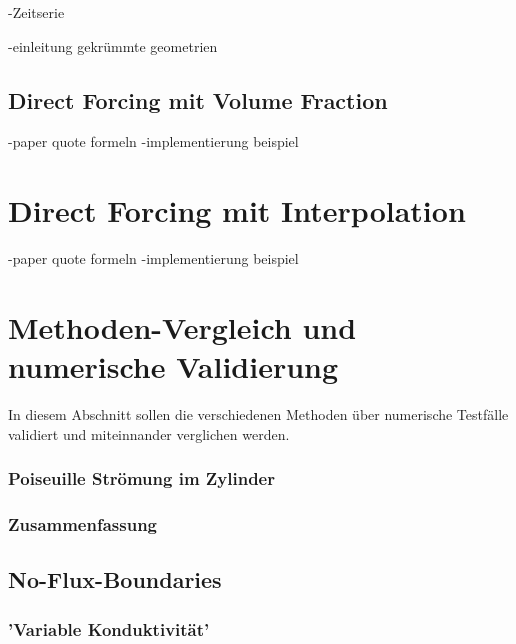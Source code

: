 -Zeitserie

-einleitung gekrümmte geometrien

\subsection{Direct Forcing mit Volume Fraction}
-paper quote formeln
-implementierung beispiel

\section{Direct Forcing mit Interpolation}
-paper quote formeln
-implementierung beispiel

\section{Methoden-Vergleich und numerische Validierung}
In diesem Abschnitt sollen die verschiedenen Methoden über numerische Testfälle validiert und miteinnander
verglichen werden.


\subsubsection{Poiseuille Strömung im Zylinder}

\subsubsection{Zusammenfassung}


\subsection{No-Flux-Boundaries}

\subsubsection{'Variable Konduktivität'}










